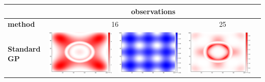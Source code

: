 \documentclass{article}
\numberwithin{equation}{section}
\begin{document}
\begin{table}
  \centering
  \captionsetup{justification=centering}
  \begin{tabularx}{\textwidth}{| X | p{} p{} || p{} p{} |}
    \hline
    & \multicolumn{4}{c|}{\textbf{observations}} \\
    \hline
    \centering \textbf{method} & \multicolumn{2}{c||}{16} & \multicolumn{2}{c|}{25} \\
    \hline \hline
    \centering \textbf{Standard GP} &
      \parbox[c]{.18\textwidth}{\includegraphics[scale=0.2]{figures/heatmaps/error-noder-16.png}} &
      \parbox[c]{.18\textwidth}{\includegraphics[scale=0.2]{figures/heatmaps/variance-noder-16.png}} &
      \parbox[c]{.18\textwidth}{\includegraphics[scale=0.2]{figures/heatmaps/error-noder-25.png}} &

\end{tabularx}
\end{table}
\end{document}
